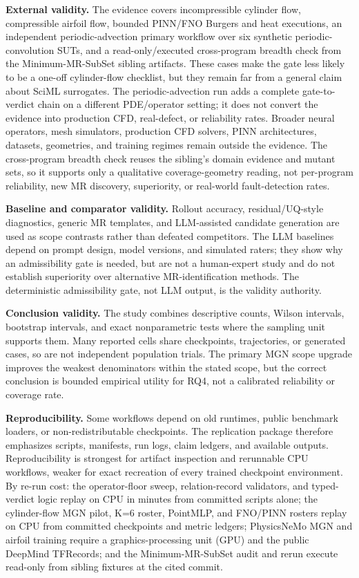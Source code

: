 \documentclass[preprint,12pt]{elsarticle}
\begin{document}
\textbf{External validity.} The evidence covers incompressible cylinder flow, compressible airfoil flow, bounded PINN/FNO Burgers and heat executions, an independent periodic-advection primary workflow over six synthetic periodic-convolution SUTs, and a read-only/executed cross-program breadth check from the Minimum-MR-SubSet sibling artifacts. These cases make the gate less likely to be a one-off cylinder-flow checklist, but they remain far from a general claim about SciML surrogates. The periodic-advection run adds a complete gate-to-verdict chain on a different PDE/operator setting; it does not convert the evidence into production CFD, real-defect, or reliability rates. Broader neural operators, mesh simulators, production CFD solvers, PINN architectures, datasets, geometries, and training regimes remain outside the evidence. The cross-program breadth check reuses the sibling's domain evidence and mutant sets, so it supports only a qualitative coverage-geometry reading, not per-program reliability, new MR discovery, superiority, or real-world fault-detection rates.

\textbf{Baseline and comparator validity.} Rollout accuracy, residual/UQ-style diagnostics, generic MR templates, and LLM-assisted candidate generation are used as scope contrasts rather than defeated competitors. The LLM baselines depend on prompt design, model versions, and simulated raters; they show why an admissibility gate is needed, but are not a human-expert study and do not establish superiority over alternative MR-identification methods. The deterministic admissibility gate, not LLM output, is the validity authority.

\textbf{Conclusion validity.} The study combines descriptive counts, Wilson intervals, bootstrap intervals, and exact nonparametric tests where the sampling unit supports them. Many reported cells share checkpoints, trajectories, or generated cases, so are not independent population trials. The primary MGN scope upgrade improves the weakest denominators within the stated scope, but the correct conclusion is bounded empirical utility for RQ4, not a calibrated reliability or coverage rate.

\textbf{Reproducibility.} Some workflows depend on old runtimes, public benchmark loaders, or non-redistributable checkpoints. The replication package therefore emphasizes scripts, manifests, run logs, claim ledgers, and available outputs. Reproducibility is strongest for artifact inspection and rerunnable CPU workflows, weaker for exact recreation of every trained checkpoint environment. By re-run cost: the operator-floor sweep, relation-record validators, and typed-verdict logic replay on CPU in minutes from committed scripts alone; the cylinder-flow MGN pilot, K=6 roster, PointMLP, and FNO/PINN rosters replay on CPU from committed checkpoints and metric ledgers; PhysicsNeMo MGN and airfoil training require a graphics-processing unit (GPU) and the public DeepMind TFRecords; and the Minimum-MR-SubSet audit and rerun execute read-only from sibling fixtures at the cited commit.
\end{document}
